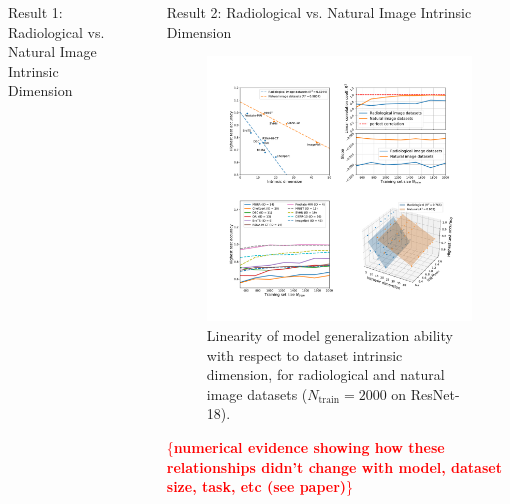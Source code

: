 \documentclass[final,hyperref={pdfpagelabels=false}]{beamer}
\newcommand{\todo}[1]{\textcolor{red}{\{\textbf{#1}\}}}
\begin{document}
\begin{frame}[t]
\begin{columns}[t]
\begin{column}{.3\textwidth}
\begin{block}{Result 1: Radiological vs. Natural Image Intrinsic Dimension}
\end{block}


\end{column} %

\begin{column}{.03\textwidth}\end{column} %
 
\begin{column}{.3\textwidth} %


\begin{block}{Result 2: Radiological vs. Natural Image Intrinsic Dimension}

\begin{figure}
    \includegraphics[width=0.95\linewidth]{frompaper/main_fig_multi_0.pdf}
     \caption{Linearity of model generalization ability with respect to dataset intrinsic dimension, for \textcolor{paperblue}{radiological} and \textcolor{paperorange}{natural} image datasets ($N_\text{train}=2000$ on ResNet-18).}
\end{figure}

\todo{numerical evidence showing how these relationships didn't change with model, dataset size, task, etc (see paper)}

\end{block}


\end{column}
\end{columns}
\end{frame}
\end{document}
